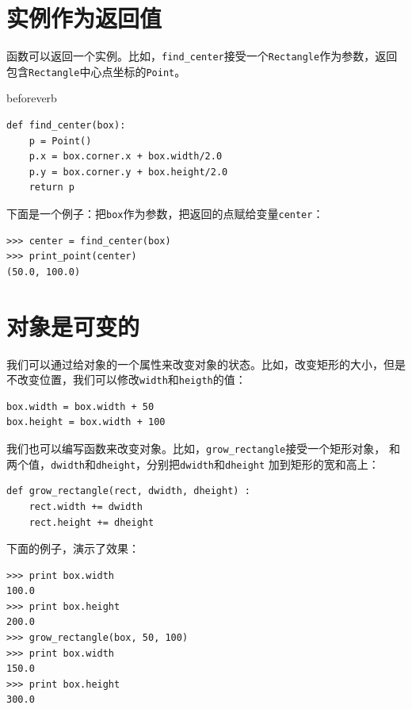 
\section{实例作为返回值}


函数可以返回一个实例。比如，\verb"find_center"接受一个{\tt Rectangle}作为参数，返回包含{\tt Rectangle}中心点坐标的{\tt Point}。

beforeverb
\begin{verbatim}
def find_center(box):
    p = Point()
    p.x = box.corner.x + box.width/2.0
    p.y = box.corner.y + box.height/2.0
    return p
\end{verbatim}
\afterverb

下面是一个例子：把{\tt box}作为参数，把返回的点赋给变量{\tt center}：

\beforeverb
\begin{verbatim}
>>> center = find_center(box)
>>> print_point(center)
(50.0, 100.0)
\end{verbatim}
\afterverb
%

\section{对象是可变的}


我们可以通过给对象的一个属性来改变对象的状态。比如，改变矩形的大小，但是不改变位置，我们可以修改{\tt width}和{\tt heigth}的值：

\beforeverb
\begin{verbatim}
box.width = box.width + 50
box.height = box.width + 100
\end{verbatim}
\afterverb
%

我们也可以编写函数来改变对象。比如，\verb"grow_rectangle"接受一个矩形对象，
和两个值，{\tt dwidth}和{\tt dheight}，分别把{\tt dwidth}和{\tt dheight}
加到矩形的宽和高上：

\beforeverb
\begin{verbatim}
def grow_rectangle(rect, dwidth, dheight) :
    rect.width += dwidth
    rect.height += dheight
\end{verbatim}
\afterverb

下面的例子，演示了效果：

\beforeverb
\begin{verbatim}
>>> print box.width
100.0
>>> print box.height
200.0
>>> grow_rectangle(box, 50, 100)
>>> print box.width
150.0
>>> print box.height
300.0
\end{verbatim}
\afterverb

